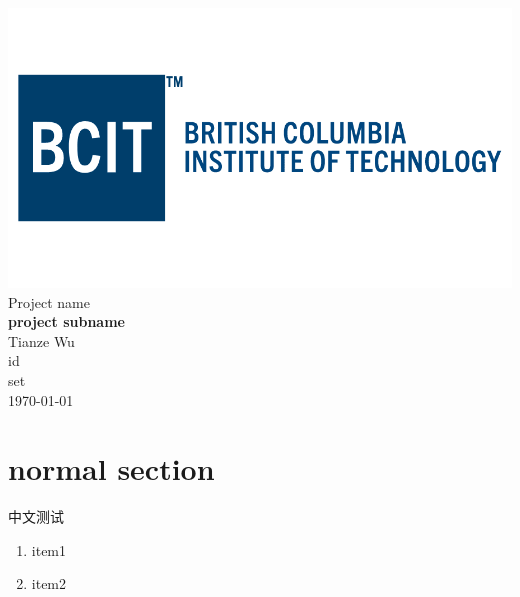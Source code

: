 \documentclass[letterpaper,12pt,notitlepage]{article}
\begin{document}
\begin{titlepage}
	\vspace{5cm}
	\begin{center}
		\includegraphics[scale=0.4]{bcit.png}\\

		\huge{Project name}\\
		\vspace{10mm}
		\large{\textbf{project subname}}\\
		\vspace{10mm}
		\large{Tianze Wu}\\
		\vspace{5mm}
		id\\
		\vspace{5mm}
		set\\
		\vspace{5mm}
		\today

	\end{center}
\end{titlepage}


\section{normal section}

中文测试

\begin{enumerate}
	\item item1
	\item item2
\end{enumerate}

\clearpage
\end{document}

